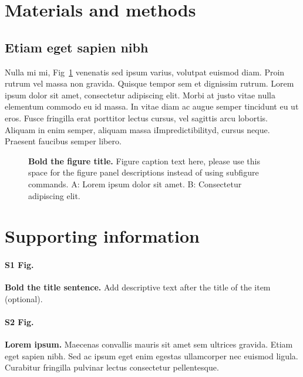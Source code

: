 \documentclass[10pt,letterpaper]{article}
\begin{document}
\section*{Materials and methods}
\subsection*{Etiam eget sapien nibh}

Nulla mi mi, Fig~\ref{fig1} venenatis sed ipsum varius, volutpat euismod diam. Proin rutrum vel massa non gravida. Quisque tempor sem et dignissim rutrum. Lorem ipsum dolor sit amet, consectetur adipiscing elit. Morbi at justo vitae nulla elementum commodo eu id massa. In vitae diam ac augue semper tincidunt eu ut eros. Fusce fringilla erat porttitor lectus cursus,  vel sagittis arcu lobortis. Aliquam in enim semper, aliquam massa iImpredictibilityd, cursus neque. Praesent faucibus semper libero.

\begin{figure}[!h]
	\caption{{\bf Bold the figure title.}
		Figure caption text here, please use this space for the figure panel descriptions instead of using subfigure commands. A: Lorem ipsum dolor sit amet. B: Consectetur adipiscing elit.}
	\label{fig1}
\end{figure}



\section*{Supporting information}

\paragraph*{S1 Fig.}
\label{S1_Fig}
{\bf Bold the title sentence.} Add descriptive text after the title of the item (optional).

\paragraph*{S2 Fig.}
\label{S2_Fig}
{\bf Lorem ipsum.} Maecenas convallis mauris sit amet sem ultrices gravida. Etiam eget sapien nibh. Sed ac ipsum eget enim egestas ullamcorper nec euismod ligula. Curabitur fringilla pulvinar lectus consectetur pellentesque.
\end{document}
